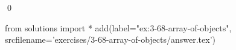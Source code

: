 
\begin{ex}
  \label{ex:3-68-array-of-objects}
  
  \qed
\end{ex}
\begin{python0}
from solutions import *
add(label="ex:3-68-array-of-objects",
    srcfilename='exercises/3-68-array-of-objects/answer.tex')
\end{python0}
